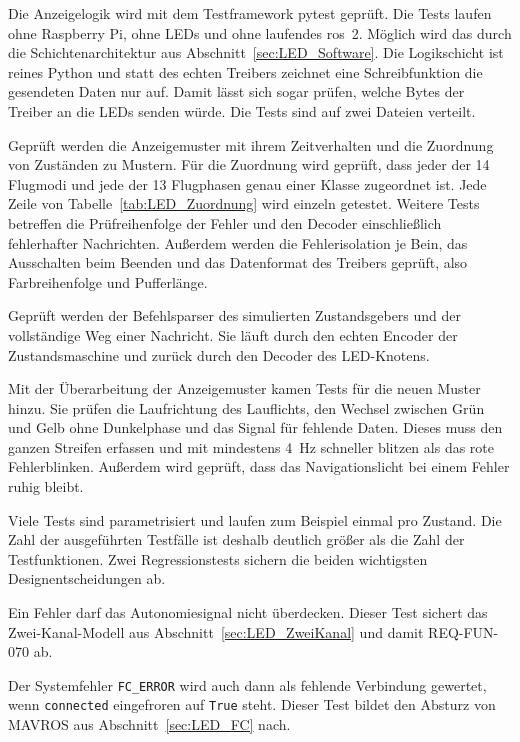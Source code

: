         Die Anzeigelogik wird mit dem Testframework pytest geprüft. Die Tests laufen ohne Raspberry Pi, ohne LEDs und ohne laufendes \gls{ros}~2. Möglich wird das durch die Schichtenarchitektur aus Abschnitt~\ref{sec:LED_Software}. Die Logikschicht ist reines Python und statt des echten Treibers zeichnet eine Schreibfunktion die gesendeten Daten nur auf. Damit lässt sich sogar prüfen, welche Bytes der Treiber an die LEDs senden würde. Die Tests sind auf zwei Dateien verteilt.

        \begin{description}[style=nextline]
            \item[\texttt{test\_led\_logic.py} (60 Testfunktionen)] Geprüft werden die Anzeigemuster mit ihrem Zeitverhalten und die Zuordnung von Zuständen zu Mustern. Für die Zuordnung wird geprüft, dass jeder der 14 Flugmodi und jede der 13 Flugphasen genau einer Klasse zugeordnet ist. Jede Zeile von Tabelle~\ref{tab:LED_Zuordnung} wird einzeln getestet. Weitere Tests betreffen die Prüfreihenfolge der Fehler und den Decoder einschließlich fehlerhafter Nachrichten. Außerdem werden die Fehlerisolation je Bein, das Ausschalten beim Beenden und das Datenformat des Treibers geprüft, also Farbreihenfolge und Pufferlänge.
            \item[\texttt{test\_sil.py} (10 Testfunktionen)] Geprüft werden der Befehlsparser des simulierten Zustandsgebers und der vollständige Weg einer Nachricht. Sie läuft durch den echten Encoder der Zustandsmaschine und zurück durch den Decoder des LED-Knotens.
        \end{description}

        Mit der Überarbeitung der Anzeigemuster kamen Tests für die neuen Muster hinzu. Sie prüfen die Laufrichtung des Lauflichts, den Wechsel zwischen Grün und Gelb ohne Dunkelphase und das Signal für fehlende Daten. Dieses muss den ganzen Streifen erfassen und mit mindestens \SI{4}{\hertz} schneller blitzen als das rote Fehlerblinken. Außerdem wird geprüft, dass das Navigationslicht bei einem Fehler ruhig bleibt.

        Viele Tests sind parametrisiert und laufen zum Beispiel einmal pro Zustand. Die Zahl der ausgeführten Testfälle ist deshalb deutlich größer als die Zahl der Testfunktionen. Zwei Regressionstests sichern die beiden wichtigsten Designentscheidungen ab.

        \begin{description}[style=nextline]
            \item[\texttt{test\_error\_cannot\_hide\_\allowbreak the\_autonomy\_indicator}] Ein Fehler darf das Autonomiesignal nicht überdecken. Dieser Test sichert das Zwei-Kanal-Modell aus Abschnitt~\ref{sec:LED_ZweiKanal} und damit REQ-FUN-070 ab.
            \item[\texttt{test\_fc\_error\_means\_no\_link\_\allowbreak even\_with\_connected\_frozen\_true}] Der Systemfehler \texttt{FC\_ERROR} wird auch dann als fehlende Verbindung gewertet, wenn \texttt{connected} eingefroren auf \texttt{True} steht. Dieser Test bildet den Absturz von MAVROS aus Abschnitt~\ref{sec:LED_FC} nach.
        \end{description}

